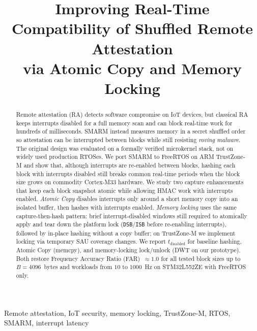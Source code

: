 \documentclass[conference]{IEEEtran}
\newcommand{\tdis}{$t_{\mathrm{disabled}}$\xspace}
\begin{document}
\title{Improving Real-Time Compatibility of Shuffled Remote Attestation\\
via Atomic Copy and Memory Locking}

\author{
}

\maketitle

\begin{abstract}
Remote attestation (RA) detects software compromise on IoT devices, but
classical RA keeps interrupts disabled for a full memory scan and can
block real-time work for hundreds of milliseconds.
SMARM instead measures memory in a secret shuffled order so attestation
can be interrupted between blocks while still resisting
\emph{roving malware}.
The original design was evaluated on a formally verified microkernel
stack, not on widely used production RTOSes.
We port SMARM to FreeRTOS on ARM TrustZone-M and show that, although
interrupts are re-enabled between blocks, hashing each block with
interrupts disabled still breaks common real-time periods when the block
size grows on commodity Cortex-M33 hardware.
We study two capture enhancements that keep each block snapshot atomic
while allowing HMAC work with interrupts enabled.
\emph{Atomic Copy} disables interrupts only around a short memory copy
into an isolated buffer, then hashes with interrupts enabled.
\emph{Memory locking} uses the same capture-then-hash pattern: brief
interrupt-disabled windows still required to atomically apply and tear
down the platform lock (\texttt{DSB}/\texttt{ISB} before re-enabling
interrupts), followed by in-place hashing without a copy buffer; on
TrustZone-M we implement locking via temporary SAU coverage changes.
We report \tdis for baseline hashing, Atomic Copy (memcpy), and
memory-locking lock/unlock (DWT on our prototype).
Both restore Frequency Accuracy Ratio (FAR)~$\approx 1.0$ for all tested
block sizes up to $B{=}4096$~bytes and workloads from $10$ to $1000$~Hz
on STM32L552ZE with FreeRTOS only.
\end{abstract}

\begin{IEEEkeywords}
Remote attestation, IoT security, memory locking, TrustZone-M, RTOS,
SMARM, interrupt latency
\end{IEEEkeywords}
\end{document}
